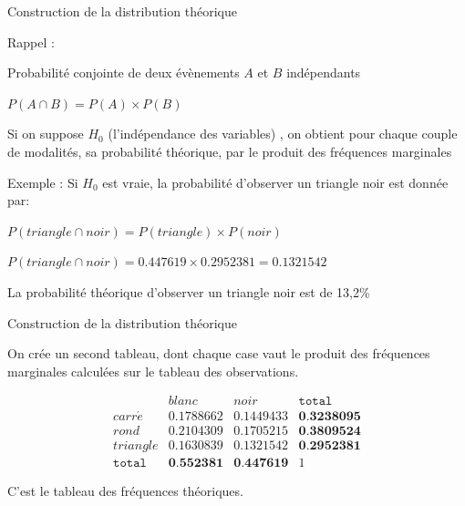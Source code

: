 \documentclass{beamer}
\begin{document}
\begin{frame}{ Construction de la distribution théorique}

Rappel : 

Probabilité conjointe de deux évènements $A$ et $B$ \alert{indépendants}  


$P(A \cap B) = P(A) \times P(B)$

\vspace{0.6cm}
Si on suppose $H_0$ (l'indépendance des variables) , on obtient pour chaque couple de modalités, sa probabilité \alert{théorique}, par le \alert{produit des fréquences marginales }


\vspace{0.6cm}
\begin{tiny}
\begin{spacing}{0.85}
Exemple :  Si $H_0$ est vraie, la probabilité d'observer un triangle noir est donnée par: 

$P(triangle \cap noir) = P(triangle) \times P(noir)$

$P(triangle \cap noir) =0.447619 \times 0.2952381  = 0.1321542$

La probabilité théorique d'observer un triangle noir est de 13,2\%  
\end{spacing}
\end{tiny}

\end{frame}


\begin{frame}{ Construction de la distribution théorique}

On crée un \alert{second tableau}, dont chaque case vaut le produit des fréquences marginales calculées sur le tableau des observations.

$$\begin{array}{c|c|c|c}
   & blanc & noir & \texttt{total}\\ 
   \hline
carr\acute{e} &  0.1788662 &   0.1449433 &  \textbf{0.3238095}\\ 
  \hline
  rond &    0.2104309 &0.1705215 & \textbf{0.3809524}  \\ 
    \hline
  triangle &  0.1630839 & 0.1321542 &   \textbf{0.2952381}\\
  \hline
  \texttt{total} &  \textbf{0.552381} & \textbf{0.447619} & 1
  \end{array}$$

C'est le tableau des \alert{fréquences théoriques}.


\end{frame}
\end{document}
